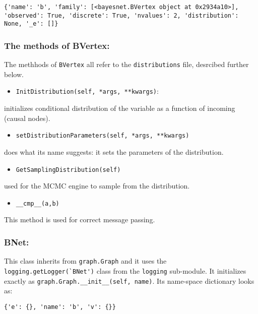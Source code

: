 \documentclass[11pt]{article}
\begin{document}
\begin{verbatim}
{'name': 'b', 'family': [<bayesnet.BVertex object at 0x2934a10>],
'observed': True, 'discrete': True, 'nvalues': 2, 'distribution': None, '_e': []}
\end{verbatim}
\subsubsection{The methods of BVertex:}
\label{sec-1-2-2}


The methhods of \verb|BVertex| all refer to the \verb|distributions| file, desrcibed further below.
\begin{itemize}
\item \verb|InitDistribution(self, *args, **kwargs)|:
\end{itemize}

initializes conditional distribution of the variable as a function of incoming (causal nodes).

\begin{itemize}
\item \verb|setDistributionParameters(self, *args, **kwargs)|
\end{itemize}

does what its name suggests: it sets the parameters of the distribution.

\begin{itemize}
\item \verb|GetSamplingDistribution(self)|
\end{itemize}

used for the MCMC engine to sample from the distribution.

\begin{itemize}
\item \verb|__cmp__(a,b)|
\end{itemize}

This method is used for correct message passing.
\subsubsection{BNet:}
\label{sec-1-2-3}


This class inherits from \verb|graph.Graph| and it uses the \verb|logging.getLogger(`BNet')| class from the \verb|logging| sub-module. It initializes exactly as \verb|graph.Graph.__init__(self, name)|. Its name-space dictionary looks as:

\begin{verbatim}
{'e': {}, 'name': 'b', 'v': {}}
\end{verbatim}
\end{document}
